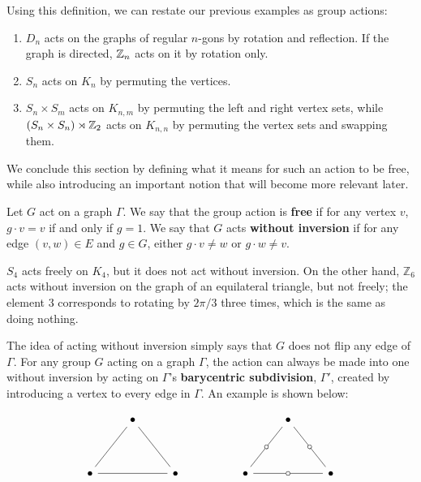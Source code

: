 \noindent Using this definition, we can restate our previous examples as group actions: 

\begin{enumerate}
    \item $D_n$ acts on the graphs of regular $n$-gons by rotation and reflection. If the graph is directed, $\mathbb{Z}_n$ acts on it by rotation only.
    \item $S_n$ acts on $K_n$ by permuting the vertices.
    \item $S_n \times S_m$ acts on $K_{n,m}$ by permuting the left and right vertex sets, while $(S_n \times S_n) \rtimes \mathbb{Z}_2$ acts on $K_{n,n}$ by permuting the vertex sets and swapping them. 
\end{enumerate}

We conclude this section by defining what it means for such an action to be free, while also introducing an important notion that will become more relevant later.

\begin{defn}
    Let $G$ act on a graph $\Gamma$. We say that the group action is \textbf{free} if for any vertex $v$, $g \cdot v = v$ if and only if $g = 1$.  We say that $G$ acts \textbf{without inversion} if for any edge $(v,w) \in E$ and $g \in G$, either $g \cdot v \neq w$ or $g \cdot w \neq v$. 
\end{defn}

\begin{example}
    $S_4$ acts freely on $K_4$, but it does not act without inversion. On the other hand, $\mathbb{Z}_6$ acts without inversion on the graph of an equilateral triangle, but not freely; the element 3 corresponds to rotating by $2\pi/3$ three times, which is the same as doing nothing. 
\end{example}

The idea of acting without inversion simply says that $G$ does not flip any edge of $\Gamma$. For any group $G$ acting on a graph $\Gamma$, the action can always be made into one without inversion by acting on $\Gamma$'s \textbf{barycentric subdivision}, $\Gamma'$, created by introducing a vertex to every edge in $\Gamma$. An example is shown below:

\[\begin{tikzcd}
	& \bullet &&&& \bullet & \\
	\\
	\bullet && \bullet && \bullet && \bullet
	\arrow[no head, from=1-2, to=3-3]
	\arrow["\bullet"{marking, text=\pgfkeysvalueof{/tikz/commutative diagrams/background color}}, "\circ"{marking}, no head, from=1-6, to=3-7]
	\arrow[no head, from=3-1, to=1-2]
	\arrow[no head, from=3-3, to=3-1]
	\arrow["\bullet"{marking, text=\pgfkeysvalueof{/tikz/commutative diagrams/background color}}, "\circ"{marking}, no head, from=3-5, to=1-6]
	\arrow["\bullet"{marking, text=\pgfkeysvalueof{/tikz/commutative diagrams/background color}}, "\circ"{marking}, no head, from=3-7, to=3-5]
\end{tikzcd}\]


